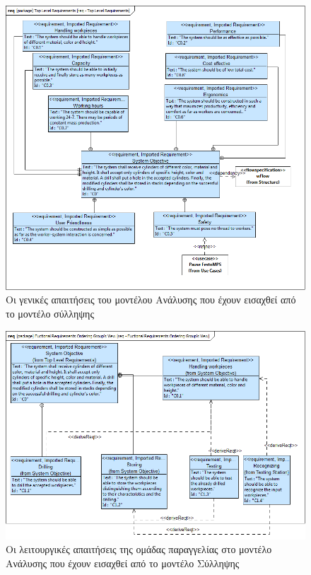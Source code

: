 \documentclass[a4paper,12pt,twoside]{report}
\begin{document}
\begin{appendices}
			\begin{figure}[hp]
					\centering
					\includegraphics[scale=0.45]{AnalysisModel_req-TopLevelRequirements.png}
					\caption{Οι γενικές απαιτήσεις του μοντέλου Ανάλυσης που έχουν εισαχθεί από το μοντέλο σύλληψης}
					\label{φωτ:Οι γενικές απαιτήσεις του μοντέλου Ανάλυσης που έχουν εισαχθεί από το μοντέλο σύλληψης}
			\end{figure}
				
			\begin{figure}[hp]
					\centering
					\includegraphics[scale=0.45]{AnalysisModel_req-FuctionalRequirementsOrderingGroupsView.png}
					\caption{Οι λειτουργικές απαιτήσεις της ομάδας παραγγελίας στο μοντέλο Ανάλυσης που έχουν εισαχθεί από το μοντέλο Σύλληψης}
					\label{φωτ:Οι λειτουργικές απαιτήσεις της ομάδας παραγγελίας στο μοντέλο Ανάλυσης που έχουν εισαχθεί από το μοντέλο Σύλληψης}
			\end{figure}
				

\end{appendices}
\end{document}

